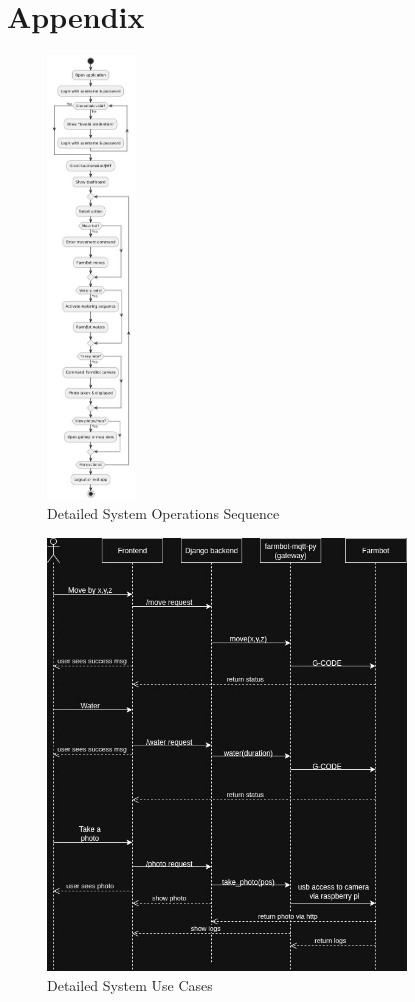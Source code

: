 \chapter{Appendix}

\begin{figure}[h]
    \centering
    \includegraphics[width=0.21\textwidth]{img/farmbot-sequence.jpg}
    \caption{Detailed System Operations Sequence}
    \label{fig:sequence-detail}
\end{figure}


\begin{figure}[h]
    \centering
    \includegraphics[width=0.85\textwidth]{img/farmbot-usecase.jpg}
    \caption{Detailed System Use Cases}
    \label{fig:usecase-detail}
\end{figure}

